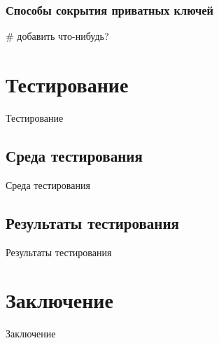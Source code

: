 \documentclass[20pt]{article}
\begin{document}
\subsubsection{Способы сокрытия приватных ключей}
\# добавить что-нибудь?

\newpage

\section{Тестирование}
Тестирование

\subsection{Среда тестирования}
Среда тестирования

\subsection{Результаты тестирования}
Результаты тестирования

\newpage

\section{Заключение}
Заключение



\end{document}
